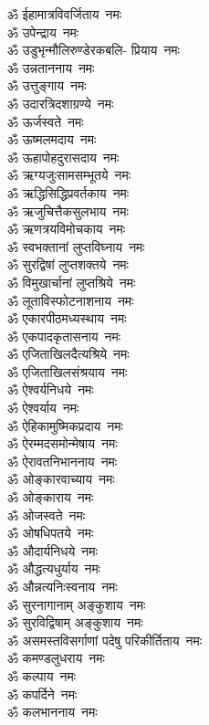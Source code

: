 \begin{multicols}{2}
\begin{flushleft}
ॐ ईहामात्रविवर्जिताय~नमः\\
ॐ उपेन्द्राय~नमः\\
ॐ उडुभृन्मौलिरुण्डेरकबलि- प्रियाय~नमः\\
ॐ उन्नताननाय~नमः\\
ॐ उत्तुङ्गाय~नमः\\
ॐ उदारत्रिदशाग्रण्ये~नमः\\
ॐ ऊर्जस्वते~नमः\\
ॐ ऊष्मलमदाय~नमः\\
ॐ ऊहापोहदुरासदाय~नमः\\
ॐ ऋग्यजुःसामसम्भूतये~नमः\hfill{}\\
ॐ ऋद्धिसिद्धिप्रवर्तकाय~नमः\\
ॐ ऋजुचित्तैकसुलभाय~नमः\\
ॐ ऋणत्रयविमोचकाय~नमः\\
ॐ स्वभक्तानां लुप्तविघ्नाय~नमः\\
ॐ सुरद्विषां लुप्तशक्तये~नमः\\
ॐ विमुखार्चानां लुप्तश्रिये~नमः\\
ॐ लूताविस्फोटनाशनाय~नमः\\
ॐ एकारपीठमध्यस्थाय~नमः\\
ॐ एकपादकृतासनाय~नमः\\
ॐ एजिताखिलदैत्यश्रिये~नमः\hfill{}\\
ॐ एजिताखिलसंश्रयाय~नमः\\
ॐ ऐश्वर्यनिधये~नमः\\
ॐ ऐश्वर्याय~नमः\\
ॐ ऐहिकामुष्मिकप्रदाय~नमः\\
ॐ ऐरम्मदसमोन्मेषाय~नमः\\
ॐ ऐरावतनिभाननाय~नमः\\
ॐ ओङ्कारवाच्याय~नमः\\
ॐ ओङ्काराय~नमः\\
ॐ ओजस्वते~नमः\\
ॐ ओषधिपतये~नमः\hfill{}\\
ॐ औदार्यनिधये~नमः\\
ॐ औद्धत्यधुर्याय~नमः\\
ॐ औन्नत्यनिःस्वनाय~नमः\\
ॐ सुरनागानाम् अङ्कुशाय~नमः\\
ॐ सुरविद्विषाम् अङ्कुशाय~नमः\\
ॐ असमस्तविसर्गाणां पदेषु परिकीर्तिताय~नमः\\
ॐ कमण्डलुधराय~नमः\\
ॐ कल्पाय~नमः\\
ॐ कपर्दिने~नमः\\
ॐ कलभाननाय~नमः\hfill{}\\

\end{flushleft}
\end{multicols}
